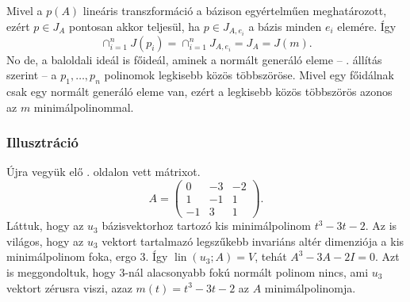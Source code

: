 \documentclass[a4paper, showtrims]{memoir}
\makeatletter
\renewenvironment{proof}[1][\proofname]
    {\par\pushQED{\qed}%
    \normalfont \topsep6\p@\@plus6\p@\relax
    \trivlist
    \item[\hskip\labelsep
        \itshape
    #1\@addpunct{:}]\ignorespaces}
    {\popQED\endtrivlist\@endpefalse}
\theoremstyle{plain}
\theoremstyle{remark}
\theoremstyle{definition}
\DeclareMathOperator{\lin}{lin}
\makeatother
\begin{document}
\begin{proof}[Egy másik bizonyítás]
	Mivel a $p\left( A \right)$ lineáris transzformáció a bázison egyértelműen meghatározott,
	ezért $p\in J_A$ pontosan akkor teljesül,
	ha $p\in J_{A,e_i}$ a bázis minden $e_i$ elemére.
	Így
	\[
		\cap_{i=1}^nJ(p_i)
		=
		\cap_{i=1}^nJ_{A,e_i}
		=
		J_A
		=
		J(m).
	\]
	No de, a baloldali ideál is főideál, aminek a normált generáló eleme
    -- . állítás szerint --
	a $p_1,\ldots,p_n$ polinomok legkisebb közös többszöröse.
	Mivel egy főidálnak csak egy normált generáló eleme van,
	ezért a legkisebb közös többszörös azonos az $m$ minimálpolinommal.
\end{proof}
\subsubsection{Illusztráció}\label{se:minimalillusztracio}
Újra vegyük elő \aazt{\pageref{se:kisminimalillusztracio}}. oldalon vett mátrixot.
\[
    A=
    \begin{pmatrix}
        0&-3&-2\\
        1&-1&1\\
        -1&3&1
    \end{pmatrix}.
\]
Láttuk, hogy az $u_3$ bázisvektorhoz tartozó kis minimálpolinom $t^3-3t-2$.
Az is világos, hogy az $u_3$ vektort tartalmazó legszűkebb invariáns altér dimenziója a kis minimálpolinom foka, 
ergo 3.
Így $\lin\left( u_3;A \right)=V$, tehát $A^3-3A-2I=0$.
Azt is meggondoltuk, hogy $3$-nál alacsonyabb fokú normált polinom nincs, ami $u_3$ vektort zérusra viszi,
azaz $m\left( t \right)=t^{3}-3t-2$ az $A$ minimálpolinomja.
\end{document}
